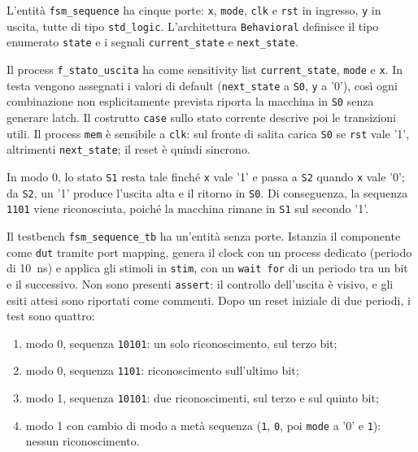 \implementazione

L'entità \texttt{fsm\_sequence} ha cinque porte: \texttt{x}, \texttt{mode}, \texttt{clk} e \texttt{rst} in ingresso, \texttt{y} in uscita, tutte di tipo \texttt{std\_logic}. L'architettura \texttt{Behavioral} definisce il tipo enumerato \texttt{state} e i segnali \texttt{current\_state} e \texttt{next\_state}.

Il process \texttt{f\_stato\_uscita} ha come sensitivity list \texttt{current\_state}, \texttt{mode} e \texttt{x}. In testa vengono assegnati i valori di default (\texttt{next\_state} a \texttt{S0}, \texttt{y} a '0'), così ogni combinazione non esplicitamente prevista riporta la macchina in \texttt{S0} senza generare latch. Il costrutto \texttt{case} sullo stato corrente descrive poi le transizioni utili. Il process \texttt{mem} è sensibile a \texttt{clk}: sul fronte di salita carica \texttt{S0} se \texttt{rst} vale '1', altrimenti \texttt{next\_state}; il reset è quindi sincrono.


In modo 0, lo stato \texttt{S1} resta tale finché \texttt{x} vale '1' e passa a \texttt{S2} quando \texttt{x} vale '0'; da \texttt{S2}, un '1' produce l'uscita alta e il ritorno in \texttt{S0}. Di conseguenza, la sequenza \texttt{1101} viene riconosciuta, poiché la macchina rimane in \texttt{S1} sul secondo '1'.

\simulazione

Il testbench \texttt{fsm\_sequence\_tb} ha un'entità senza porte. Istanzia il componente come \texttt{dut} tramite port mapping, genera il clock con un process dedicato (periodo di \SI{10}{ns}) e applica gli stimoli in \texttt{stim}, con un \texttt{wait for} di un periodo tra un bit e il successivo. Non sono presenti \texttt{assert}: il controllo dell'uscita è visivo, e gli esiti attesi sono riportati come commenti. Dopo un reset iniziale di due periodi, i test sono quattro:

\begin{enumerate}
  \item modo 0, sequenza \texttt{10101}: un solo riconoscimento, sul terzo bit;
  \item modo 0, sequenza \texttt{1101}: riconoscimento sull'ultimo bit;
  \item modo 1, sequenza \texttt{10101}: due riconoscimenti, sul terzo e sul quinto bit;
  \item modo 1 con cambio di modo a metà sequenza (\texttt{1}, \texttt{0}, poi \texttt{mode} a '0' e \texttt{1}): nessun riconoscimento.
\end{enumerate}

